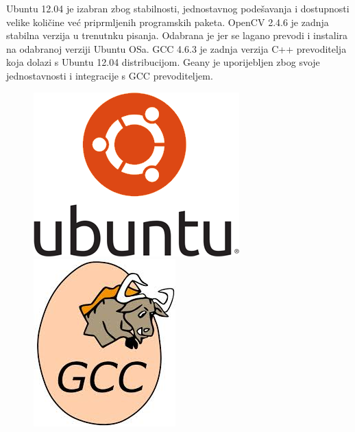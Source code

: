 Ubuntu 12.04 je izabran zbog stabilnosti, jednostavnog podešavanja i
dostupnosti velike količine već priprmljenih programskih paketa.  OpenCV
2.4.6 je zadnja stabilna verzija u trenutnku pisanja. Odabrana je jer se
lagano prevodi i instalira na odabranoj verziji Ubuntu OSa.  GCC 4.6.3
je zadnja verzija C++ prevoditelja koja dolazi s Ubuntu 12.04
distribucijom.  Geany je uporijebljen zbog svoje jednostavnosti i
integracije s GCC prevoditeljem.  \\


\begin{figure}[!htb]
    \includegraphics[width=\linewidth]{figures/ubuntu.png}
\endminipage\hfill
{}
    \includegraphics[width=\linewidth]{figures/gcc.jpeg}

\end{figure}
